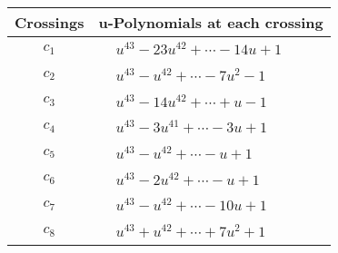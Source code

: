 \documentclass[1p]{elsarticle_modified}
\theoremstyle{definition}
\begin{document}
\begin{tabular}{m{50pt}|m{274pt}}
Crossings & \hspace{64pt}u-Polynomials at each crossing \\
\hline $$\begin{aligned}c_{1}\end{aligned}$$&$\begin{aligned}
&u^{43}-23 u^{42}+\cdots-14 u+1
\end{aligned}$\\
\hline $$\begin{aligned}c_{2}\end{aligned}$$&$\begin{aligned}
&u^{43}- u^{42}+\cdots-7 u^2-1
\end{aligned}$\\
\hline $$\begin{aligned}c_{3}\end{aligned}$$&$\begin{aligned}
&u^{43}-14 u^{42}+\cdots+u-1
\end{aligned}$\\
\hline $$\begin{aligned}c_{4}\end{aligned}$$&$\begin{aligned}
&u^{43}-3 u^{41}+\cdots-3 u+1
\end{aligned}$\\
\hline $$\begin{aligned}c_{5}\end{aligned}$$&$\begin{aligned}
&u^{43}- u^{42}+\cdots- u+1
\end{aligned}$\\
\hline $$\begin{aligned}c_{6}\end{aligned}$$&$\begin{aligned}
&u^{43}-2 u^{42}+\cdots- u+1
\end{aligned}$\\
\hline $$\begin{aligned}c_{7}\end{aligned}$$&$\begin{aligned}
&u^{43}- u^{42}+\cdots-10 u+1
\end{aligned}$\\
\hline $$\begin{aligned}c_{8}\end{aligned}$$&$\begin{aligned}
&u^{43}+u^{42}+\cdots+7 u^2+1
\end{aligned}$\\

\end{tabular}
\end{document}
